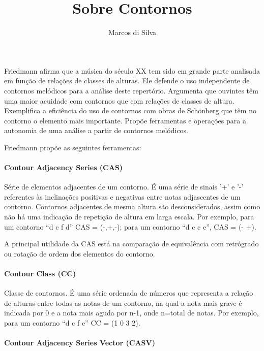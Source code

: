 \documentclass{article}
\title{Sobre Contornos}
\author{Marcos di Silva}
\begin{document}
\setlength{\parindent}{0cm}
\maketitle
\thispagestyle{empty}

Friedmann \cite{friedmann85:_method_discus_contour} afirma que a
música do século XX tem sido em grande parte analisada em função de
relações de classes de alturas. Ele defende o uso independente de
contornos melódicos para a análise deste repertório. Argumenta que
ouvintes têm uma maior acuidade com contornos que com relações de
classes de altura. Exemplifica a eficiência do uso de contornos com
obras de Schönberg que têm no contorno o elemento mais
importante. Propõe ferramentas e operações para a autonomia de uma
análise a partir de contornos melódicos.

Friedmann \cite{friedmann85:_method_discus_contour} propõe as seguintes
ferramentas:

\paragraph{Contour Adjacency Series (CAS)}
\label{sec:cont-adjac-seri}

Série de elementos adjacentes de um contorno. É uma série de sinais
'+' e '-' referentes às inclinações positivas e negativas entre notas
adjascentes de um contorno. Contornos adjacentes de mesma altura são
desconsiderados, assim como não há uma indicação de repetição de
altura em larga escala. Por exemplo, para um contorno ``d c f d'' CAS
= (-,+,-); para um contorno ``d c c e'', CAS = (- +).

A principal utilidade da CAS está na comparação de equivalência com
retrógrado ou rotação de ordem dos elementos do contorno.

\paragraph{Contour Class (CC)}
\label{sec:contour-class-cc}

Classe de contornos. É uma série ordenada de números que representa a
relação de alturas entre todas as notas de um contorno, na qual a nota
mais grave é indicada por 0 e a nota mais aguda por n-1, onde n=total
de notas. Por exemplo, para um contorno ``d c f e'' CC = (1 0 3 2).

\paragraph{Contour Adjacency Series Vector (CASV)}
\label{sec:cont-adjac-seri-1}
\end{document}
